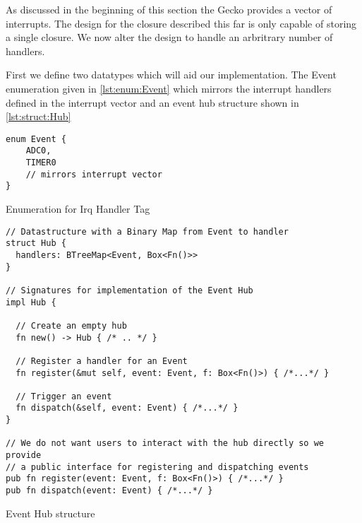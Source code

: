As discussed in the beginning of this section the Gecko provides a vector of interrupts.
The design for the closure described this far is only capable of storing a single closure.
We now alter the design to handle an arbritrary number of handlers.

First we define two datatypes which will aid our implementation.
The Event enumeration given in \autoref{lst:enum:Event} which mirrors the interrupt handlers defined in the interrupt vector and an event hub structure shown in \autoref{lst:struct:Hub}

\begin{listing}[H]
  \begin{verbatim}
enum Event {
    ADC0,
    TIMER0
    // mirrors interrupt vector
}
  \end{verbatim}
  \caption{Enumeration for Irq Handler Tag}
  \label{lst:enum:Event}
\end{listing}

\begin{listing}[H]
  \begin{verbatim}
// Datastructure with a Binary Map from Event to handler
struct Hub {
  handlers: BTreeMap<Event, Box<Fn()>>
}

// Signatures for implementation of the Event Hub
impl Hub {

  // Create an empty hub
  fn new() -> Hub { /* .. */ }

  // Register a handler for an Event
  fn register(&mut self, event: Event, f: Box<Fn()>) { /*...*/ }

  // Trigger an event
  fn dispatch(&self, event: Event) { /*...*/ }
}

// We do not want users to interact with the hub directly so we provide
// a public interface for registering and dispatching events
pub fn register(event: Event, f: Box<Fn()>) { /*...*/ }
pub fn dispatch(event: Event) { /*...*/ }
  \end{verbatim}
  \caption{Event Hub structure}
  \label{lst:struct:Hub}
\end{listing}

